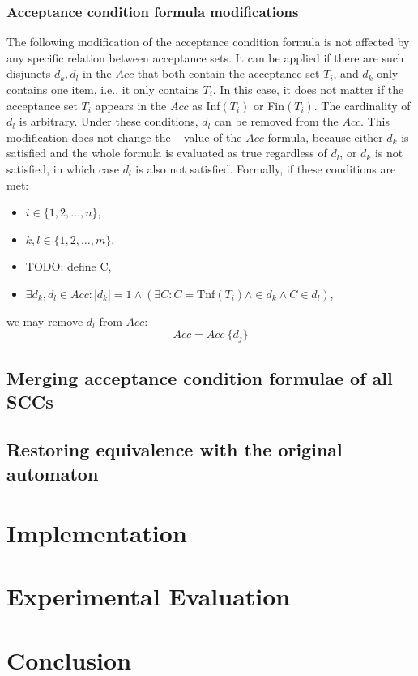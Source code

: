 \documentclass[
  digital, %
  twoside, %
  table,   %
  lof,     %
  lot,     %
]{fithesis3}
\begin{document}
\subsection{Acceptance condition formula modifications}
The following modification of the acceptance condition formula is not affected by any specific relation between acceptance sets. It can be applied if there are such disjuncts $d_k, d_l$ in the $Acc$ that both contain the acceptance set $T_i$, and $d_k$ only contains one item, i.e., it only contains $T_i$. In this case, it does not matter if the acceptance set $T_i$ appears in the $Acc$ as Inf$(T_i)$ or Fin$(T_i)$. The cardinality of $d_l$ is arbitrary. Under these conditions, $d_l$ can be removed from the $Acc$. This modification does not change the -- value of the $Acc$ formula, because either $d_k$ is satisfied and the whole formula is evaluated as true regardless of $d_l$, or $d_k$ is not satisfied, in which case $d_l$ is also not satisfied. 
Formally, if these conditions are met:
\begin{itemize}
  \item $i \in \{1,2, \dots, n\}$,
  \item $k,l \in \{1,2, \dots, m\}$,
  \item TODO: define C,
  \item $\exists d_k, d_l \in Acc \colon |d_k| = 1 \wedge (\exists C \colon C = \text{Tnf}(T_i) \wedge \in d_k \wedge C \in d_l)$,
\end{itemize}
we may remove $d_l$ from $Acc$:
\begin{equation*}
  Acc = Acc \ \{d_j\}
\end{equation*}




\section{Merging acceptance condition formulae of all SCCs}

\section{Restoring equivalence with the original automaton}


\chapter{Implementation}


\chapter{Experimental Evaluation}


\chapter{Conclusion}



\printbibliography[heading=bibintoc]
\end{document}
